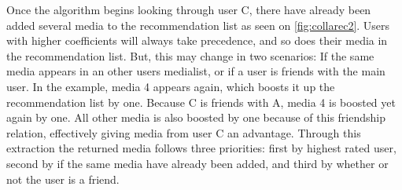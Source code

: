 Once the algorithm begins looking through user C, there have already been added several media to the recommendation list as seen on \ref{fig:collarec2}. Users with higher coefficients will always take precedence, and so does their media in the recommendation list. But, this may change in two scenarios: If the same media appears in an other users medialist, or if a user is friends with the main user. In the example, media 4 appears again, which boosts it up the recommendation list by one. Because C is friends with A, media 4 is boosted yet again by one. All other media is also boosted by one because of this friendship relation, effectively giving media from user C an advantage. Through this extraction the returned media follows three priorities: first by highest rated user, second by if the same media have already been added, and third by whether or not the user is a friend.
